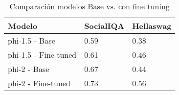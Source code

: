 \begin{table}[h!]
\centering
\begin{tabular}{lll}
\toprule
Modelo & SocialIQA & Hellaswag \\
\midrule
phi-1.5 - Base & 0.59 & 0.38 \\
phi-1.5 - Fine-tuned & 0.61 & 0.46 \\
phi-2 - Base & 0.67 & 0.44 \\
phi-2 - Fine-tuned & 0.73 & 0.56 \\
\bottomrule
\end{tabular}

\caption{Comparación modelos Base vs. con fine tuning}
\label{tab:performance_comparison}
\end{table}